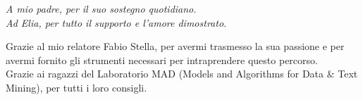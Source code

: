 \documentclass[11pt,twoside]{toptesi}
\begin{document}
	





\frontmatter

\begin{flushright}
\noindent
\textit{A mio padre, per il suo sostegno quotidiano.}\\
\textit{Ad Elia, per tutto il supporto e l'amore dimostrato.} \\
\end{flushright}
\cleardoublepage


%


\ringraziamenti
Grazie al mio relatore Fabio Stella, per avermi trasmesso la sua passione e per avermi fornito gli strumenti necessari per intraprendere questo percorso.\\ 
Grazie ai ragazzi del Laboratorio MAD (Models and Algorithms for Data \& Text Mining), per tutti i loro consigli.


\sommario
\end{document}
